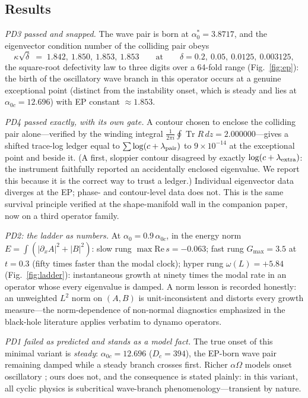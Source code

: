 \documentclass[11pt]{article}
\theoremstyle{definition}
\theoremstyle{remark}
\newcommand{\Tr}{\operatorname{Tr}}
\begin{document}
\subsection{Results}
\emph{PD3 passed and snapped.} The wave pair is born at
$\alpha_0^*=3.8717$, and the eigenvector condition number of the colliding
pair obeys
\[
\kappa\sqrt{\delta} \;=\; 1.842,\ 1.850,\ 1.853,\ 1.853
\qquad\text{at}\qquad \delta = 0.2,\ 0.05,\ 0.0125,\ 0.003125,
\]
the square-root defectivity law to three digits over a 64-fold range
(Fig.~\ref{fig:ep}): the birth of the oscillatory wave branch in this operator occurs at a
genuine exceptional point (distinct from the instability onset, which is
steady and lies at $\alpha_{0c}=12.696$) with EP constant $\approx1.853$.

\emph{PD4 passed exactly, with its own gate.} A contour chosen to enclose the
colliding pair alone---verified by the winding integral
$\frac{1}{2\pi i}\oint\Tr R\,dz = 2.000000$---gives a shifted trace-log
ledger equal to $\sum\log(c+\lambda_{\rm pair})$ to $9\times10^{-14}$ at the
exceptional point and beside it. (A first, sloppier contour disagreed by
exactly $\log(c+\lambda_{\rm extra})$: the instrument faithfully reported an
accidentally enclosed eigenvalue. We report this because it is the correct
way to trust a ledger.) Individual eigenvector data diverges at the EP;
phase- and contour-level data does not. This is the same survival principle
verified at the shape-manifold wall in the companion paper, now on a third
operator family.

\emph{PD2: the ladder as numbers.} At $\alpha_0=0.9\,\alpha_{0c}$, in the
energy norm $E=\int(|\partial_xA|^2+|B|^2)$: slow rung
$\max\mathrm{Re}\,s=-0.063$; fast rung $G_{\max}=3.5$ at $t=0.3$ (fifty
times faster than the modal clock); hyper rung $\omega(L)=+5.84$
(Fig.~\ref{fig:ladder}): instantaneous growth at ninety times the modal
rate in an operator whose every eigenvalue is damped. A norm lesson is
recorded honestly: an unweighted $L^2$ norm on $(A,B)$ is unit-inconsistent
and distorts every growth measure---the norm-dependence of non-normal
diagnostics emphasized in the black-hole literature \cite{gasperin} applies
verbatim to dynamo operators.

\emph{PD1 failed as predicted and stands as a model fact.} The true onset of
this minimal variant is \emph{steady}: $\alpha_{0c}=12.696$ ($D_c=394$), the
EP-born wave pair remaining damped while a steady branch crosses first.
Richer $\alpha\Omega$ models onset oscillatory \cite{charbonneau}; ours does
not, and the consequence is stated plainly: in this variant, all cyclic
physics is subcritical wave-branch phenomenology---transient by nature.
\end{document}

